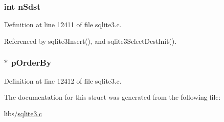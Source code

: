 \hypertarget{struct_select_dest_a9a504236f70a6baca1f3dc884ab3c23c}{}
\subsubsection[{n\+Sdst}]{\setlength{\rightskip}{0pt plus 5cm}int n\+Sdst}\label{struct_select_dest_a9a504236f70a6baca1f3dc884ab3c23c}


Definition at line 12411 of file sqlite3.\+c.



Referenced by sqlite3\+Insert(), and sqlite3\+Select\+Dest\+Init().

\hypertarget{struct_select_dest_a9150e506e5902e336130c9764caf96a0}{}
\subsubsection[{p\+Order\+By}]{$\ast$ p\+Order\+By}\label{struct_select_dest_a9150e506e5902e336130c9764caf96a0}


Definition at line 12412 of file sqlite3.\+c.



The documentation for this struct was generated from the following file\+:\begin{DoxyCompactItemize}
\item 
libs/\hyperlink{sqlite3_8c}{sqlite3.\+c}\end{DoxyCompactItemize}
